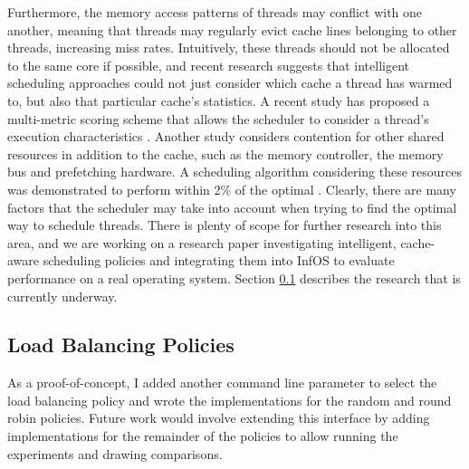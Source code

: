 \documentclass[bsc,frontabs,singlespacing,parskip,deptreport]{infthesis}
\begin{document}
Furthermore, the memory access patterns of threads may conflict with one another, meaning that threads may regularly evict cache lines belonging to other threads, increasing miss rates. Intuitively, these threads should not be allocated to the same core if possible, and recent research suggests that intelligent scheduling approaches could not just consider which cache a thread has warmed to, but also that particular cache's statistics. A recent study has proposed a multi-metric scoring scheme that allows the scheduler to consider a thread's execution characteristics \cite{adaptive-sched}. Another study considers contention for other shared resources in addition to the cache, such as the memory controller, the memory bus and prefetching hardware. A scheduling algorithm considering these resources was demonstrated to perform within 2\% of the optimal \cite{contention-aware-sched}. Clearly, there are many factors that the scheduler may take into account when trying to find the optimal way to schedule threads. There is plenty of scope for further research into this area, and we are working on a research paper investigating intelligent, cache-aware scheduling policies and integrating them into InfOS to evaluate performance on a real operating system. Section \ref{load-balancing-policies} describes the research that is currently underway.




\subsection{Load Balancing Policies} \label{load-balancing-policies}
As a proof-of-concept, I added another command line parameter to select the load balancing policy and wrote the implementations for the random and round robin policies. Future work would involve extending this interface by adding implementations for the remainder of the policies to allow running the experiments and drawing comparisons.
\end{document}
